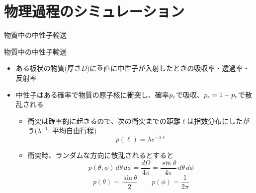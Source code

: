 \section{物理過程のシミュレーション}

\begin{frame}[t,fragile]{物質中の中性子輸送}
  \begin{center}
  \end{center}
\end{frame}

\begin{frame}[t,fragile]{物質中の中性子輸送}
  \begin{itemize}
  \item ある板状の物質(厚さ$D$)に垂直に中性子が入射したときの吸収率・透過率・反射率
  \item 中性子はある確率で物質の原子核に衝突し、確率$p_{\rm c}$で吸収、$p_{\rm s}=1-p_{\rm c}$で散乱される
    \begin{itemize}
    \item 衝突は確率的に起きるので、次の衝突までの距離$\ell$は指数分布にしたがう($\lambda^{-1}$: 平均自由行程)
      \[
      p(\ell) = \lambda e^{-\lambda\ell}
      \]
    \item 衝突時、ランダムな方向に散乱されるとすると
      \[
      p(\theta,\phi) \, d\theta \, d\phi = \frac{d\Omega}{4\pi} = \frac{\sin \theta}{4\pi} \, d\theta \, d\phi
      \]
      \[
      p(\theta) = \frac{\sin \theta}{2} \qquad p(\phi)=\frac{1}{2\pi}
      \]
    \end{itemize}
  \end{itemize}
\end{frame}

